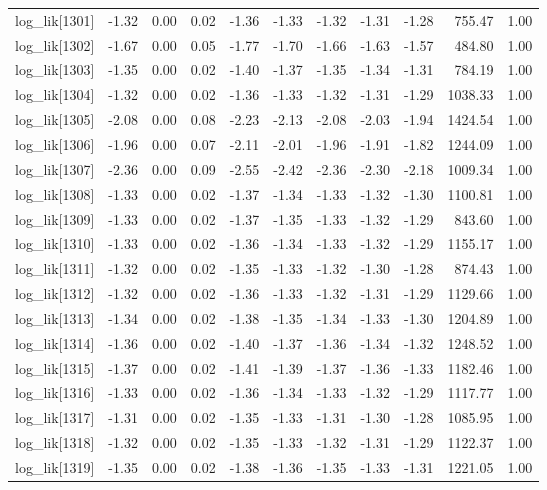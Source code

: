 \begin{table}[ht]
\begin{tabular}{rrrrrrrrrrr}
  log\_lik[1301] & -1.32 & 0.00 & 0.02 & -1.36 & -1.33 & -1.32 & -1.31 & -1.28 & 755.47 & 1.00 \\ 
  log\_lik[1302] & -1.67 & 0.00 & 0.05 & -1.77 & -1.70 & -1.66 & -1.63 & -1.57 & 484.80 & 1.00 \\ 
  log\_lik[1303] & -1.35 & 0.00 & 0.02 & -1.40 & -1.37 & -1.35 & -1.34 & -1.31 & 784.19 & 1.00 \\ 
  log\_lik[1304] & -1.32 & 0.00 & 0.02 & -1.36 & -1.33 & -1.32 & -1.31 & -1.29 & 1038.33 & 1.00 \\ 
  log\_lik[1305] & -2.08 & 0.00 & 0.08 & -2.23 & -2.13 & -2.08 & -2.03 & -1.94 & 1424.54 & 1.00 \\ 
  log\_lik[1306] & -1.96 & 0.00 & 0.07 & -2.11 & -2.01 & -1.96 & -1.91 & -1.82 & 1244.09 & 1.00 \\ 
  log\_lik[1307] & -2.36 & 0.00 & 0.09 & -2.55 & -2.42 & -2.36 & -2.30 & -2.18 & 1009.34 & 1.00 \\ 
  log\_lik[1308] & -1.33 & 0.00 & 0.02 & -1.37 & -1.34 & -1.33 & -1.32 & -1.30 & 1100.81 & 1.00 \\ 
  log\_lik[1309] & -1.33 & 0.00 & 0.02 & -1.37 & -1.35 & -1.33 & -1.32 & -1.29 & 843.60 & 1.00 \\ 
  log\_lik[1310] & -1.33 & 0.00 & 0.02 & -1.36 & -1.34 & -1.33 & -1.32 & -1.29 & 1155.17 & 1.00 \\ 
  log\_lik[1311] & -1.32 & 0.00 & 0.02 & -1.35 & -1.33 & -1.32 & -1.30 & -1.28 & 874.43 & 1.00 \\ 
  log\_lik[1312] & -1.32 & 0.00 & 0.02 & -1.36 & -1.33 & -1.32 & -1.31 & -1.29 & 1129.66 & 1.00 \\ 
  log\_lik[1313] & -1.34 & 0.00 & 0.02 & -1.38 & -1.35 & -1.34 & -1.33 & -1.30 & 1204.89 & 1.00 \\ 
  log\_lik[1314] & -1.36 & 0.00 & 0.02 & -1.40 & -1.37 & -1.36 & -1.34 & -1.32 & 1248.52 & 1.00 \\ 
  log\_lik[1315] & -1.37 & 0.00 & 0.02 & -1.41 & -1.39 & -1.37 & -1.36 & -1.33 & 1182.46 & 1.00 \\ 
  log\_lik[1316] & -1.33 & 0.00 & 0.02 & -1.36 & -1.34 & -1.33 & -1.32 & -1.29 & 1117.77 & 1.00 \\ 
  log\_lik[1317] & -1.31 & 0.00 & 0.02 & -1.35 & -1.33 & -1.31 & -1.30 & -1.28 & 1085.95 & 1.00 \\ 
  log\_lik[1318] & -1.32 & 0.00 & 0.02 & -1.35 & -1.33 & -1.32 & -1.31 & -1.29 & 1122.37 & 1.00 \\ 
  log\_lik[1319] & -1.35 & 0.00 & 0.02 & -1.38 & -1.36 & -1.35 & -1.33 & -1.31 & 1221.05 & 1.00 \\ 

\end{tabular}
\end{table}
